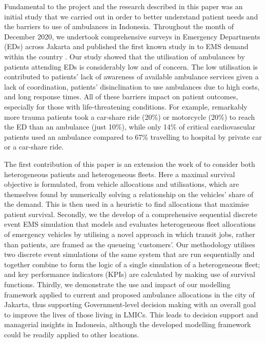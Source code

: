 \documentclass[preprint,12pt]{elsarticle}
\begin{document}
Fundamental to the project and the research described in this paper was an
initial study that we carried out in order to better understand patient needs
and the barriers to use of ambulances in Indonesia. Throughout the month of
December 2020, we undertook comprehensive surveys in Emergency Departments
(EDs) across Jakarta and published the first known study in to EMS demand
within the country \cite{BriceSyaribahNoor2022Esui}. Our study showed that the
utilisation of ambulances by patients attending EDs is considerably low and of
concern. The low utilisation is contributed to patients’ lack of awareness of
available ambulance services given a lack of coordination, patients’
disinclination to use ambulances due to high costs, and long response times.
All of these barriers impact on patient outcomes, especially for those with
life-threatening conditions. For example, remarkably more trauma patients took
a car-share ride (20\%) or motorcycle (20\%) to reach the ED than an ambulance
(just 10\%), while only 14\% of critical cardiovascular patients used an
ambulance compared to 67\% travelling to hospital by private car or a
car-share ride.

The first contribution of this paper is an extension the work of
\cite{Knight2012918} to consider both heterogeneous patients and heterogeneous
fleets. Here a maximal survival objective is formulated, from vehicle
allocations and utilisations, which are themselves found by numerically
solving a relationship on the vehicles' share of the demand. This is then used
in a heuristic to find allocations that maximise patient survival.
Secondly, we the develop of a comprehensive sequential discrete event EMS
simulation that models and evaluates heterogeneous fleet allocations of
emergency vehicles by utilising a novel approach in which transit jobs, rather
than patients, are framed as the queueing `customers'. Our methodology
utilises two discrete event simulations of the same system that are run
sequentially and together combine to form the logic of a single simulation of
a heterogeneous fleet; and key performance indicators (KPIs) are calculated by
making use of survival functions.
Thirdly, we demonstrate the use and impact of our modelling framework applied
to current and proposed ambulance allocations in the city of Jakarta, thus
supporting Government-level decision making with an overall goal to improve
the lives of those living in LMICs. This leads to decision support and
managerial insights in Indonesia, although the developed modelling framework
could be readily applied to other locations.
\end{document}
